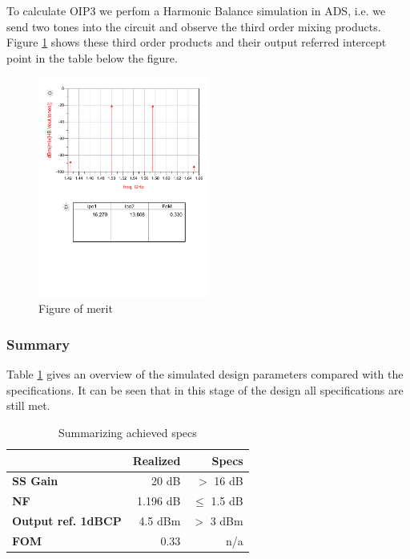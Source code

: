 \documentclass[a4paper]{article}        %
\begin{document}
			To calculate OIP3 we perfom a Harmonic Balance simulation in ADS, i.e. we send two tones into the circuit and observe the third order mixing products. Figure \ref{fig:lna_fom} shows these third order products and their output referred intercept point in the table below the figure. 
			
			\begin{figure}[H]
				\centering
				\includegraphics[width=0.5\textwidth]{fig/LNA/fom.pdf}
				\caption{Figure of merit}
				\label{fig:lna_fom}
			\end{figure}

		\subsubsection{Summary}
			Table \ref{tab:lna_summ} gives an overview of the simulated design parameters compared with the specifications. It can be seen that in this stage of the design all specifications are still met.  

			\begin{table}[H]
			\centering
			\begin{tabular}{|l|r|r|}
				\hline
				 & \textbf{Realized} & \textbf{Specs} \\
				\hline
				\textbf{SS Gain} & 20 dB & $>$ 16 dB \\
				\hline
				\textbf{NF} & 1.196 dB & $\leq$ 1.5 dB \\
				\hline
				\textbf{Output ref. 1dBCP} & 4.5 dBm & $>$ 3 dBm \\
				\hline
				\textbf{FOM} & 0.33 & n/a \\
				\hline
			\end{tabular}
			\caption{Summarizing achieved specs}
			\label{tab:lna_summ}
			\end{table}
\end{document}
